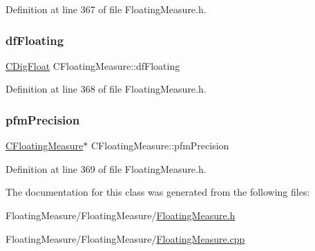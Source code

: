 Definition at line 367 of file Floating\+Measure.\+h.

\mbox{\label{classCFloatingMeasure_aa0cec9966c6c08db75c493e44396cfc2}} 
\subsubsection{\texorpdfstring{df\+Floating}{dfFloating}}
{\footnotesize\ttfamily \hyperlink{classCDigFloat}{C\+Dig\+Float} C\+Floating\+Measure\+::df\+Floating\hspace{0.3cm}{\ttfamily [protected]}}



Definition at line 368 of file Floating\+Measure.\+h.

\mbox{\label{classCFloatingMeasure_a6bc7bd6e563e69cbf29692cd97153115}} 
\subsubsection{\texorpdfstring{pfm\+Precision}{pfmPrecision}}
{\footnotesize\ttfamily \hyperlink{classCFloatingMeasure}{C\+Floating\+Measure}$\ast$ C\+Floating\+Measure\+::pfm\+Precision\hspace{0.3cm}{\ttfamily [protected]}}



Definition at line 369 of file Floating\+Measure.\+h.



The documentation for this class was generated from the following files\+:\begin{DoxyCompactItemize}
\item 
Floating\+Measure/\+Floating\+Measure/\hyperlink{FloatingMeasure_8h}{Floating\+Measure.\+h}\item 
Floating\+Measure/\+Floating\+Measure/\hyperlink{FloatingMeasure_8cpp}{Floating\+Measure.\+cpp}\end{DoxyCompactItemize}
